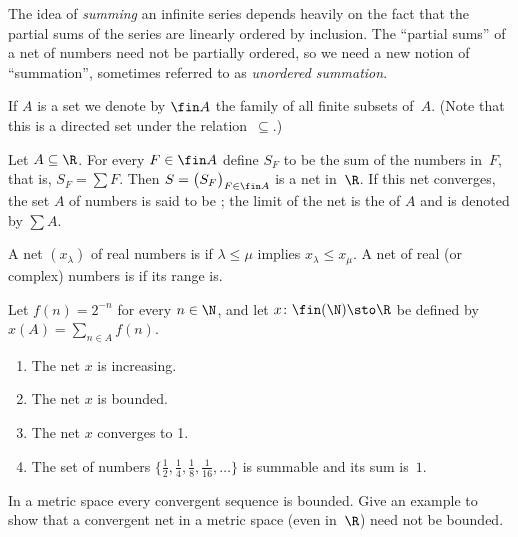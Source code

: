 The idea of \emph{summing} an infinite series depends heavily on the fact that the
partial sums of the series are linearly ordered by inclusion. The ``partial sums'' of a
net of numbers need not be partially ordered, so we need a new notion of
``summation'', sometimes referred to as \emph{unordered summation}.

\begin{notn} If $A$ is a set we denote
by $\fin A$ the family of all finite subsets of~$A$. (Note that this is a directed set under the
relation~$\subseteq$.)
\end{notn}

\begin{defn}\label{def_summable_R} Let $A \subseteq \R$.  For every $F \in \fin A$ define $S_F$ to be the sum of
the numbers in~$F$, that is, $S_F = \sum F$.  Then $S = \bigl(S_F\bigr)_{F \in \fin A}$
is a net in~$\R$.  If this net converges, the set $A$ of numbers is said to be
; the limit of the net is the
 of $A$ and is denoted by $\sum A$.
\end{defn}

\begin{defn}  A net $(x_\lambda)$ of real numbers is
 if $\lambda \le \mu$ implies $x_\lambda \le x_\mu$.  A net of real (or complex)
numbers is
 if its range is.
\end{defn}

\begin{exam}\label{C031454} Let $f(n) = 2^{-n}$ for every $n \in \N$, and let $x \colon
\fin(\N) \sto \R$ be defined by $x(A) = \sum_{n \in A}f(n)$.
 \begin{enumerate}
  \item The net $x$ is increasing.
  \item The net $x$ is bounded.
  \item The net $x$ converges to 1.
  \item The set of numbers $\{\frac12,\frac14,\frac18, \frac1{16},\dots\}$ is summable and
its sum is~$1$.
  \end{enumerate}
\end{exam}

\begin{exam} In a metric space every convergent sequence is bounded.  Give an example to show
that a convergent net in a metric space (even in~$\R$) need not be bounded.
\end{exam}

